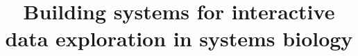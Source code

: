 \documentclass[twocolumn]{bmcart}%
\begin{document}
\begin{frontmatter}
\begin{fmbox}

\title{Building systems for interactive data exploration in systems biology}

\author[
     addressref={aff1},
   email={bjorn.fjukstad@uit.no}
]{ }
\author[
   addressref={aff1},                   %
  email={alsoanonymous@gmail.com}   %
]{ }


\address[id=aff1]{%
  , %
  ,                              %
}
\address[id=aff2]{%
  , %
  ,                              %
}



\begin{artnotes}
\end{artnotes}


\end{fmbox}
\end{frontmatter}
\end{document}
